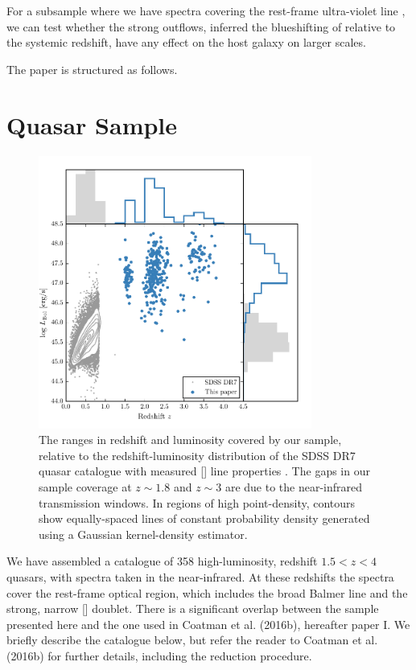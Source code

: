 For a subsample where we have spectra covering the rest-frame ultra-violet line , we can test whether the strong outflows, inferred the blueshifting of  relative to the systemic redshift, have any effect on the host galaxy on larger scales. 




The paper is structured as follows. 

\section{Quasar Sample}

\begin{figure}
    \includegraphics[width=0.8\textwidth]{figures/chapter04/luminosity_z.pdf} 
    \caption{The ranges in redshift and luminosity covered by our sample, relative to the redshift-luminosity distribution of the SDSS DR7 quasar catalogue with measured [] line properties \citep{shen11}. The gaps in our sample coverage at $z\sim1.8$ and $z\sim3$ are due to the near-infrared transmission windows. In regions of high point-density, contours show equally-spaced lines of constant probability density generated using a Gaussian kernel-density estimator.}     
    \label{fig:lzplane}
\end{figure}

We have assembled a catalogue of 358 high-luminosity, redshift $1.5 < z < 4$ quasars, with spectra taken in the near-infrared.
At these redshifts the spectra cover the rest-frame optical region, which includes the broad Balmer \hb line and the strong, narrow [] doublet. 
There is a significant overlap between the sample presented here and the one used in Coatman et al. (2016b), hereafter paper I.  
We briefly describe the catalogue below, but refer the reader to Coatman et al. (2016b) for further details, including the reduction procedure.  


